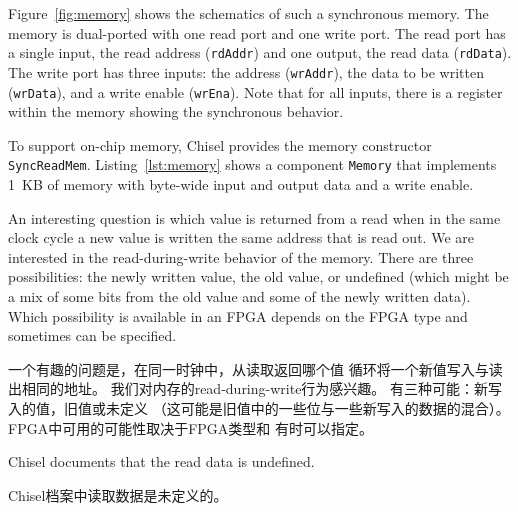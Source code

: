 \documentclass[%
    10pt,
    headinclude, footexclude,
    openright, %
    notitlepage,
    cleardoubleempty,
    headsepline,
    pointlessnumbers,
    bibtotoc, idxtotoc,
    ]{scrbook}
\newcommand{\code}[1]{{\small{\texttt{#1}}}}
\begin{document}
Figure~\ref{fig:memory} shows the schematics of such a synchronous memory.
The memory is dual-ported with one read port and one write port.
The read port has a single input, the read address (\code{rdAddr}) and
one output, the read data (\code{rdData}).
The write port has three inputs: the address (\code{wrAddr}), the data
to be written (\code{wrData}), and a write enable (\code{wrEna}).
Note that for all inputs, there is a register within the memory showing the
synchronous behavior.

To support on-chip memory, Chisel provides the memory constructor \code{SyncReadMem}.
Listing~\ref{lst:memory} shows a component \code{Memory} that implements
1~KB of memory with byte-wide input and output data and a write enable.


An interesting question is which value is returned from a read when in the same clock
cycle a new value is written the same address that is read out.
We are interested in the read-during-write behavior of the memory.
There are three possibilities: the newly written value, the old value, or undefined
(which might be a mix of some bits from the old value and some of the newly written data).
Which possibility is available in an FPGA depends on the FPGA type and
sometimes can be specified.

一个有趣的问题是，在同一时钟中，从读取返回哪个值
循环将一个新值写入与读出相同的地址。
我们对内存的read-during-write行为感兴趣。
有三种可能：新写入的值，旧值或未定义
（这可能是旧值中的一些位与一些新写入的数据的混合）。
FPGA中可用的可能性取决于FPGA类型和
有时可以指定。

Chisel documents that the read data is undefined.

Chisel档案中读取数据是未定义的。
\end{document}
